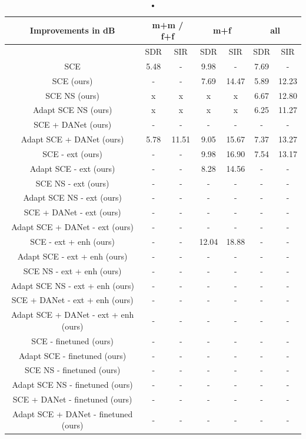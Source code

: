 \documentclass[master, tikz, final,11pt, dvipdfmx]{iscs-thesis}
\begin{document}
\begin{table}[h]
\begin{tabular}{c|c|c|c|c|c|c}
Improvements in dB & \multicolumn{2}{c|}{m+m / f+f} & \multicolumn{2}{c|}{m+f} & \multicolumn{2}{c}{all} \\ 
\hline 
 & SDR & SIR & SDR & SIR & SDR & SIR \\ 
\hline 
SCE \cite{SCE} & 5.48 & - & 9.98 & - & 7.69 & - \\ 
\hline 
SCE (ours) & - & - & 7.69 & 14.47 & 5.89 & 12.23 \\ 
\hline 
SCE NS (ours) & x & x & x & x & 6.67 & 12.80 \\
\hline 
Adapt SCE NS (ours) & x & x & x & x & 6.25 & 11.27 \\ 
\hline 
SCE + DANet (ours) & - & - & - & - & - & - \\ 
\hline 
Adapt SCE + DANet (ours) & 5.78 & 11.51 & 9.05 & 15.67 & 7.37 & 13.27 \\ 
\hline 
\hline 
SCE - ext (ours) & - & - & 9.98 & 16.90 & 7.54 & 13.17 \\ 
\hline 
Adapt SCE - ext (ours) & - & - & 8.28 & 14.56 & - & - \\ 
\hline 
SCE NS - ext (ours) & - & - & - & - & - & - \\
\hline 
Adapt SCE NS - ext (ours) & - & - & - & - & - & - \\ 
\hline 
SCE + DANet - ext (ours) & - & - & - & - & - & - \\ 
\hline 
Adapt SCE + DANet - ext (ours) & - & - & - & - & - & - \\ 
\hline
\hline 
SCE - ext + enh (ours) & - & - & 12.04 & 18.88 & - & - \\ 
\hline 
Adapt SCE - ext + enh (ours) & - & - & - & - & - & - \\ 
\hline 
SCE NS - ext + enh (ours) & - & - & - & - & - & - \\
\hline 
Adapt SCE NS - ext + enh (ours) & - & - & - & - & - & - \\ 
\hline 
SCE + DANet - ext + enh (ours)& - & - & - & - & - & - \\ 
\hline 
Adapt SCE + DANet - ext + enh (ours) & - & - & - & - & - & - \\ 
\hline 
\hline 
SCE - finetuned (ours) & - & - & - & - & - & - \\ 
\hline 
Adapt SCE - finetuned (ours) & - & - & - & - & - & - \\ 
\hline 
SCE NS - finetuned (ours) & - & - & - & - & - & - \\
\hline 
Adapt SCE NS - finetuned (ours) & - & - & - & - & - & - \\ 
\hline 
SCE + DANet - finetuned (ours) & - & - & - & - & - & - \\ 
\hline 
Adapt SCE + DANet - finetuned (ours) & - & - & - & - & - & - \\ 
\end{tabular}
\caption{•}
\end{table}
\end{document}
